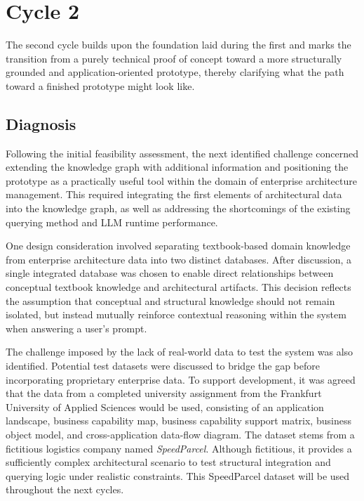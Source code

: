 \chapter{Cycle 2}
\label{ch:cycle2}
The second cycle builds upon the foundation laid during the first and marks the transition from a purely technical proof of concept toward a more structurally grounded and application-oriented prototype, thereby clarifying what the path toward a finished prototype might look like.

\section{Diagnosis}
\label{sec:cycle2_diagnosis}
Following the initial feasibility assessment, the next identified challenge concerned extending the knowledge graph with additional information and positioning the prototype as a practically useful tool within the domain of enterprise architecture management. This required integrating the first elements of architectural data into the knowledge graph, as well as addressing the shortcomings of the existing querying method and LLM runtime performance.

One design consideration involved separating textbook-based domain knowledge from enterprise architecture data into two distinct databases. After discussion, a single integrated database was chosen to enable direct relationships between conceptual textbook knowledge and architectural artifacts. This decision reflects the assumption that conceptual and structural knowledge should not remain isolated, but instead mutually reinforce contextual reasoning within the system when answering a user's prompt.

The challenge imposed by the lack of real-world data to test the system was also identified. Potential test datasets were discussed to bridge the gap before incorporating proprietary enterprise data. To support development, it was agreed that the data from a completed university assignment from the Frankfurt University of Applied Sciences would be used, consisting of an application landscape, business capability map, business capability support matrix, business object model, and cross-application data-flow diagram. The dataset stems from a fictitious logistics company named \textit{SpeedParcel}. Although fictitious, it provides a sufficiently complex architectural scenario to test structural integration and querying logic under realistic constraints. This SpeedParcel dataset will be used throughout the next cycles.

